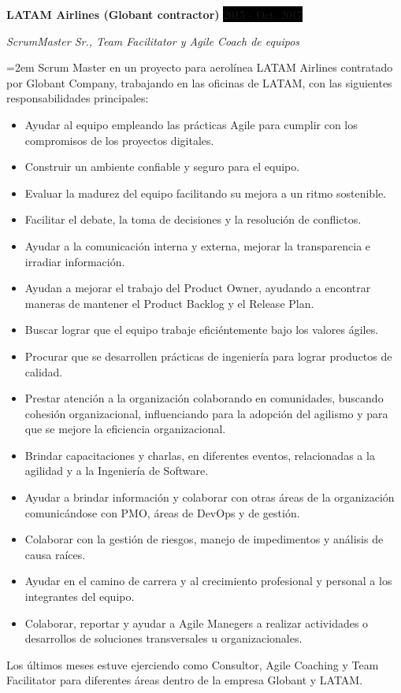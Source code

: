 \documentclass[paper=a4,fontsize=11pt]{scrartcl} %
\newcommand{\EducationEntry}[4]{
		\noindent \textbf{#1} \hfill      %
		\colorbox{Black}{%
			\parbox{6em}{%
			\hfill\color{White}#2}} \par  %
		\noindent \textit{#3} \par        %
		\noindent\hangindent=2em\hangafter=0 \small #4 %
		\normalsize \par}
\newcommand{\WorkEntry}[4]{				  %
		\noindent \textbf{#1} \hfill      %
		\colorbox{Black}{\color{White}#2} \par  %
		\noindent \textit{#3} \par              %
		\noindent\hangindent=2em\hangafter=0 \small #4 %
		\normalsize \par}
\begin{document}
\WorkEntry{LATAM Airlines (Globant contractor)}{2015 - Oct. 2017}{ScrumMaster Sr., Team Facilitator y Agile Coach de equipos}
{Scrum Master en un proyecto para aerolínea LATAM Airlines contratado por Globant Company, trabajando en las oficinas de LATAM, con las siguientes responsabilidades principales:
\begin{itemize}
\item Ayudar al equipo empleando las prácticas Agile para cumplir con los compromisos de los proyectos digitales.
\item Construir un ambiente confiable y seguro para el equipo.
\item Evaluar la madurez del equipo facilitando su mejora a un ritmo sostenible.
\item Facilitar el debate, la toma de decisiones y la resolución de conflictos.
\item Ayudar a la comunicación interna y externa, mejorar la transparencia e irradiar información.
\item Ayudan a mejorar el trabajo del Product Owner, ayudando a encontrar maneras de mantener el Product Backlog y el Release Plan.
\item Buscar lograr que el equipo trabaje eficiéntemente bajo los valores ágiles.
\item Procurar que se desarrollen prácticas de ingeniería para lograr productos de calidad.
\item Prestar atención a la organización colaborando en comunidades, buscando cohesión organizacional, influenciando para la adopción del agilismo y para que se mejore la eficiencia organizacional.
\item Brindar capacitaciones y charlas, en diferentes eventos, relacionadas a la agilidad y a la Ingeniería de Software.
\item Ayudar a brindar información y colaborar con otras áreas de la organización comunicándose con PMO, áreas de DevOps y de gestión.
\item Colaborar con la gestión de riesgos, manejo de impedimentos y análisis de causa raíces.
\item Ayudar en el camino de carrera y al crecimiento profesional y personal a los integrantes del equipo.
\item Colaborar, reportar y ayudar a Agile Manegers a realizar actividades o desarrollos de soluciones transversales u organizacionales.
\end{itemize}

Los últimos meses estuve ejerciendo como Consultor, Agile Coaching y Team Facilitator para diferentes áreas dentro de la empresa Globant y LATAM.
}
\end{document}
